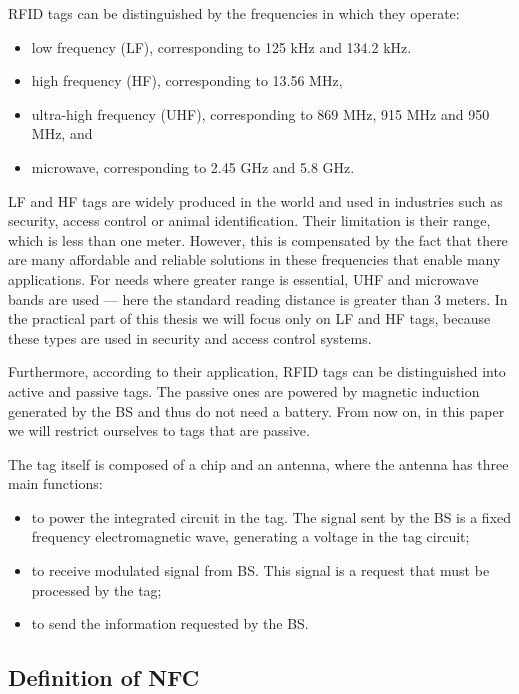 RFID tags can be distinguished by the frequencies in which they operate:

\begin{itemize}
    \item low frequency (LF), corresponding to 125 kHz and 134.2 kHz.
    \item high frequency (HF), corresponding to 13.56 MHz, 
    \item ultra-high frequency (UHF), corresponding to 869 MHz, 915 MHz and 950 MHz, and
    \item microwave, corresponding to 2.45 GHz and 5.8 GHz.
\end{itemize}

LF and HF tags are widely produced in the world and used in industries such as security, access control or animal identification. Their limitation is their range, which is less than one meter. However, this is compensated by the fact that there are many affordable and reliable solutions in these frequencies that enable many applications. For needs where greater range is essential, UHF and microwave bands are used --- here the standard reading distance is greater than 3 meters. In the practical part of this thesis we will focus only on LF and HF tags, because these types are used in security and access control systems.

Furthermore, according to their application, RFID tags can be distinguished into active and passive tags. The passive ones are powered by magnetic induction generated by the BS and thus do not need a battery. From now on, in this paper we will restrict ourselves to tags that are passive.


The tag itself is composed of a chip and an antenna, where the antenna has three main functions:

\begin{itemize}
    \item to power the integrated circuit in the tag. The signal sent by the BS is a fixed frequency electromagnetic wave, generating a voltage in the tag circuit;
    \item to receive modulated signal from BS. This signal is a request that must be processed by the tag;
    \item to send the information requested by the BS.
\end{itemize}

\subsection{Definition of NFC}

